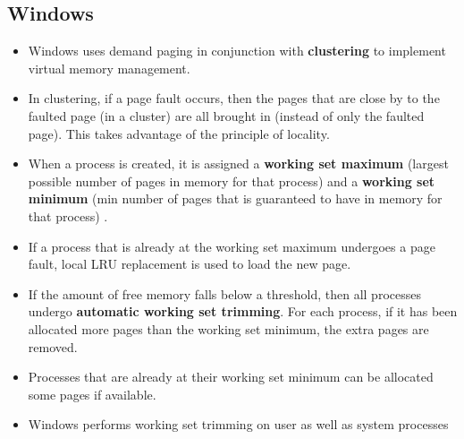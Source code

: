 \documentclass{article}
\theoremstyle{plain}
\theoremstyle{definition}
\begin{document}
\subsection{Windows}
\begin{itemize}
    \item Windows uses demand paging in conjunction with \textbf{clustering} to implement virtual memory management. 
    
    \item In clustering, if a page fault occurs, then the pages that are close by to the faulted page (in a cluster) are all brought in (instead of only the faulted page). This takes advantage of the principle of locality. 
    
    \item When a process is created, it is assigned a \textbf{working set maximum} (largest possible number of pages in memory for that process) and a \textbf{working set minimum} (min number of pages that is guaranteed to have in memory for that process) . 
    
    \item If a process that is already at the working set maximum undergoes a page fault, local LRU replacement is used to load the new page. 
    
    \item If the amount of free memory falls below a threshold, then all processes undergo \textbf{automatic working set trimming}. For each process, if it has been allocated more pages than the working set minimum, the extra pages are removed. 
    
    \item Processes that are already at their working set minimum can be allocated some pages if available. 
    
    \item Windows performs working set trimming on user as well as system processes
\end{itemize}
\end{document}
